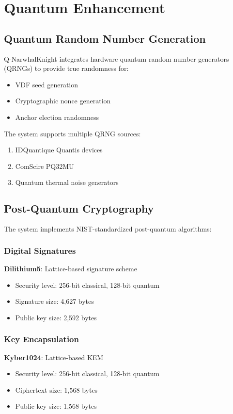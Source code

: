 \documentclass[11pt,a4paper]{article}
\begin{document}
\section{Quantum Enhancement}

\subsection{Quantum Random Number Generation}

Q-NarwhalKnight integrates hardware quantum random number generators (QRNGs) to provide true randomness for:
\begin{itemize}
    \item VDF seed generation
    \item Cryptographic nonce generation
    \item Anchor election randomness
\end{itemize}

The system supports multiple QRNG sources:
\begin{enumerate}
    \item IDQuantique Quantis devices
    \item ComScire PQ32MU
    \item Quantum thermal noise generators
\end{enumerate}

\subsection{Post-Quantum Cryptography}

The system implements NIST-standardized post-quantum algorithms:

\subsubsection{Digital Signatures}
\textbf{Dilithium5}: Lattice-based signature scheme
\begin{itemize}
    \item Security level: 256-bit classical, 128-bit quantum
    \item Signature size: 4,627 bytes
    \item Public key size: 2,592 bytes
\end{itemize}

\subsubsection{Key Encapsulation}
\textbf{Kyber1024}: Lattice-based KEM
\begin{itemize}
    \item Security level: 256-bit classical, 128-bit quantum
    \item Ciphertext size: 1,568 bytes
    \item Public key size: 1,568 bytes
\end{itemize}
\end{document}

